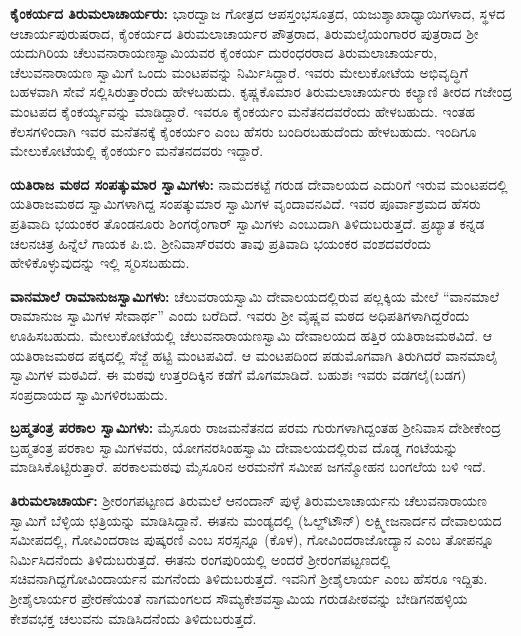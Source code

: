 \textbf{ಕೈಂಕರ್ಯದ ತಿರುಮಲಾಚಾರ್ಯರು:} ಭಾರದ್ವಾಜ ಗೋತ್ರದ ಆಪಸ್ತಂಭಸೂತ್ರದ, ಯಜುಶ್ಶಾಖಾಧ್ಯಾಯಿಗಳಾದ, ಸ್ಥಳದ ಆಚಾರ್ಯಪುರುಷರಾದ, ಕೈಂಕರ್ಯದ ತಿರುಮಲಾಚಾರ್ಯರ ಪೌತ್ರರಾದ, ತಿರುಮಲೈಯಂಗಾರರ ಪುತ್ರರಾದ ಶ‍್ರೀ ಯದುಗಿರಿಯ ಚೆಲುವನಾರಾಯಣಸ್ವಾಮಿಯವರ ಕೈಂಕರ್ಯ ದುರಂಧರರಾದ ತಿರುಮಲಾಚಾರ್ಯರು, ಚೆಲುವನಾರಾಯಣ ಸ್ವಾಮಿಗೆ ಒಂದು ಮಂಟಪವನ್ನು ನಿರ್ಮಿಸಿದ್ದಾರೆ. ಇವರು ಮೇಲುಕೋಟೆಯ ಅಭಿವೃದ್ಧಿಗೆ ಬಹಳವಾಗಿ ಸೇವೆ ಸಲ್ಲಿಸಿರುತ್ತಾರೆಂದು ಹೇಳಬಹುದು. ಕೃಷ್ಣಕೊಮಾರ ತಿರುಮಲಾಚಾರ್ಯರು ಕಲ್ಯಾಣಿ ತೀರದ ಗಜೇಂದ್ರ ಮಂಟಪದ ಕೈಂಕರ್ಯ್ಯವನ್ನು ಮಾಡಿದ್ದಾರೆ. ಇವರೂ ಕೈಂಕರ್ಯಂ ಮನೆತನದವರೆಂದು ಹೇಳಬಹುದು. ಇಂತಹ ಕೆಲಸಗಳಿಂದಾಗಿ ಇವರ ಮನೆತನಕ್ಕೆ ಕೈಂಕರ್ಯಂ ಎಂಬ ಹೆಸರು ಬಂದಿರಬಹುದೆಂದು ಹೇಳಬಹುದು. ಇಂದಿಗೂ ಮೇಲುಕೋಟೆಯಲ್ಲಿ ಕೈಂಕರ್ಯಂ ಮನೆತನದವರು ಇದ್ದಾರೆ.

\textbf{ಯತಿರಾಜ ಮಠದ ಸಂಪತ್ಕುಮಾರ ಸ್ವಾಮಿಗಳು:} ನಾಮದಕಟ್ಟೆ ಗರುಡ ದೇವಾಲಯದ ಎದುರಿಗೆ ಇರುವ ಮಂಟಪದಲ್ಲಿ ಯತಿರಾಜಮಠದ ಸ್ವಾಮಿಗಳಾಗಿದ್ದ ಸಂಪತ್ಕುಮಾರ ಸ್ವಾಮಿಗಳ ವೃಂದಾವನವಿದೆ. ಇವರ ಪೂರ್ವಾಶ್ರಮದ ಹೆಸರು ಪ್ರತಿವಾದಿ ಭಯಂಕರ ತೊಂಡನೂರು ಶಿಂಗರೈಂಗಾರ್​ ಸ್ವಾಮಿಗಳು ಎಂಬುದಾಗಿ ತಿಳಿದುಬರುತ್ತದೆ. ಪ್ರಖ್ಯಾತ ಕನ್ನಡ ಚಲನಚಿತ್ರ ಹಿನ್ನೆಲೆ ಗಾಯಕ ಪಿ.ಬಿ. ಶ‍್ರೀನಿವಾಸ್​ರವರು ತಾವು ಪ್ರತಿವಾದಿ ಭಯಂಕರ ವಂಶದವರೆಂದು ಹೇಳಿಕೊಳ್ಳುವುದನ್ನು ಇಲ್ಲಿ ಸ್ಮರಿಸಬಹುದು.

\textbf{ವಾನಮಾಲೆ ರಾಮಾನುಜಸ್ವಾಮಿಗಳು: } ಚೆಲುವರಾಯಸ್ವಾಮಿ ದೇವಾಲಯದಲ್ಲಿರುವ ಪಲ್ಲಕ್ಕಿಯ ಮೇಲೆ “ವಾನಮಾಲೆ ರಾಮಾನುಜ ಸ್ವಾಮಿಗಳ ಸೇವಾರ್ಥ” ಎಂದು ಬರೆದಿದೆ. ಇವರು ಶ‍್ರೀ ವೈಷ್ಣವ ಮಠದ ಅಧಿಪತಿಗಳಾಗಿದ್ದರೆಂದು ಊಹಿಸಬಹುದು. ಮೇಲುಕೋಟೆಯಲ್ಲಿ ಚೆಲುವನಾರಾಯಣಸ್ವಾಮಿ ದೇವಾಲಯದ ಹತ್ತಿರ ಯತಿರಾಜಮಠವಿದೆ. ಆ ಯತಿರಾಜಮಠದ ಪಕ್ಕದಲ್ಲಿ ಸೆಜ್ಜೆ ಹಟ್ಟಿ ಮಂಟಪವಿದೆ. ಆ ಮಂಟಪದಿಂದ ಪಡುಮೊಗವಾಗಿ ತಿರುಗಿದರೆ ವಾನಮಾಲೈ ಸ್ವಾಮಿಗಳ ಮಠವಿದೆ. ಈ ಮಠವು ಉತ್ತರದಿಕ್ಕಿನ ಕಡೆಗೆ ಮೊಗಮಾಡಿದೆ. ಬಹುಶಃ ಇವರು ವಡಗಲೈ(ಬಡಗ) ಸಂಪ್ರದಾಯದ ಸ್ವಾಮಿಗಳಿರಬಹುದು.

\textbf{ಬ್ರಹ್ಮತಂತ್ರ ಪರಕಾಲ ಸ್ವಾಮಿಗಳು:} ಮೈಸೂರು ರಾಜಮನೆತನದ ಪರಮ ಗುರುಗಳಾಗಿದ್ದಂತಹ ಶ‍್ರೀನಿವಾಸ ದೇಶೀಕೇಂದ್ರ ಬ್ರಹ್ಮತಂತ್ರ ಪರಕಾಲ ಸ್ವಾಮಿಗಳವರು, ಯೋಗನರಸಿಂಹಸ್ವಾಮಿ ದೇವಾಲಯದಲ್ಲಿರುವ ದೊಡ್ಡ ಗಂಟೆಯನ್ನು ಮಾಡಿಸಿಕೊಟ್ಟಿರುತ್ತಾರೆ. ಪರಕಾಲಮಠವು ಮೈಸೂರಿನ ಅರಮನೆಗೆ ಸಮೀಪ ಜಗನ್ಮೋಹನ ಬಂಗಲೆಯ ಬಳಿ ಇದೆ.

\textbf{ತಿರುಮಲಾಚಾರ್ಯ:} ಶ‍್ರೀರಂಗಪಟ್ಟಣದ ತಿರುಮಲೆ ಆನಂದಾನ್​ ಪುಳ್ಳೆ ತಿರುಮಲಾಚಾರ್ಯನು ಚೆಲುವನಾರಾಯಣ ಸ್ವಾಮಿಗೆ ಬೆಳ್ಳಿಯ ಛತ್ರಿಯನ್ನು ಮಾಡಿಸಿದ್ದಾನೆ. ಈತನು ಮಂಡ್ಯದಲ್ಲಿ (ಓಲ್ಡ್​ಟೌನ್​) ಲಕ್ಷ್ಮೀಜನಾರ್ದನ ದೇವಾಲಯದ ಸಮೀಪದಲ್ಲಿ, ಗೋವಿಂದರಾಜ ಪುಷ್ಕರಣಿ ಎಂಬ ಸರಸ್ಸನ್ನೂ (ಕೊಳ​), ಗೋವಿಂದರಾಜೋದ್ಯಾನ ಎಂಬ ತೋಪನ್ನೂ ನಿರ್ಮಿಸಿದನೆಂದು ತಿಳಿದುಬರುತ್ತದೆ. ಈತನು ರಂಗಪುರಿಯಲ್ಲಿ ಅಂದರೆ ಶ‍್ರೀರಂಗಪಟ್ಟಣದಲ್ಲಿ ಸಚಿವನಾಗಿದ್ದ\break ಗೋವಿಂದಾರ್ಯನ ಮಗನೆಂದು ತಿಳಿದುಬರುತ್ತದೆ. ಇವನಿಗೆ ಶ‍್ರೀಶೈಲಾರ್ಯ ಎಂಬ ಹೆಸರೂ ಇದ್ದಿತು. ಶ‍್ರೀಶೈಲಾರ್ಯರ ಪ್ರೇರಣೆಯಂತೆ ನಾಗಮಂಗಲದ ಸೌಮ್ಯಕೇಶವಸ್ವಾಮಿಯ ಗರುಡಪೀಠವನ್ನು ಬೇಡಿಗನಹಳ್ಳಿಯ ಕೇಶವಭಕ್ತ ಚಲುವನು ಮಾಡಿಸಿದನೆಂದು ತಿಳಿದುಬರುತ್ತದೆ.


